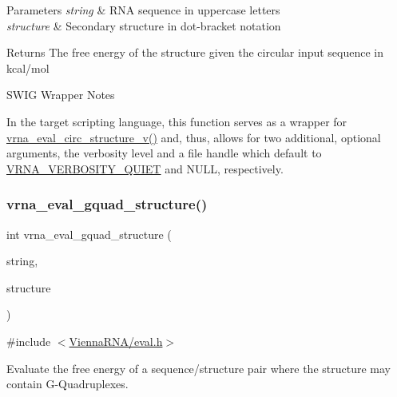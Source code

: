 \begin{DoxyParams}{Parameters}
{\em string} & R\+NA sequence in uppercase letters \\
\hline
{\em structure} & Secondary structure in dot-\/bracket notation \\
\hline
\end{DoxyParams}
\begin{DoxyReturn}{Returns}
The free energy of the structure given the circular input sequence in kcal/mol
\end{DoxyReturn}
\begin{DoxyRefDesc}{S\+W\+I\+G Wrapper Notes}
\item[\mbox{\hyperlink{wrappers__wrappers000054}{S\+W\+I\+G Wrapper Notes}}]In the target scripting language, this function serves as a wrapper for \mbox{\hyperlink{group__eval_gac3fb44e0773a51be8efc5f4f595a94a7}{vrna\+\_\+eval\+\_\+circ\+\_\+structure\+\_\+v()}} and, thus, allows for two additional, optional arguments, the verbosity level and a file handle which default to \mbox{\hyperlink{group__eval_gaf4afe19780b61b4962c613bde324128b}{V\+R\+N\+A\+\_\+\+V\+E\+R\+B\+O\+S\+I\+T\+Y\+\_\+\+Q\+U\+I\+ET}} and N\+U\+LL, respectively. \end{DoxyRefDesc}
\mbox{\label{group__eval_ga3263504825ef4b523eba797c99921df4}} 
\subsubsection{\texorpdfstring{vrna\_eval\_gquad\_structure()}{vrna\_eval\_gquad\_structure()}}
{\footnotesize\ttfamily int vrna\+\_\+eval\+\_\+gquad\+\_\+structure (\begin{DoxyParamCaption}\item[{const char $\ast$}]{string,  }\item[{const char $\ast$}]{structure }\end{DoxyParamCaption})}



{\ttfamily \#include $<$\mbox{\hyperlink{eval_8h}{Vienna\+R\+N\+A/eval.\+h}}$>$}



Evaluate the free energy of a sequence/structure pair where the structure may contain G-\/\+Quadruplexes. 

